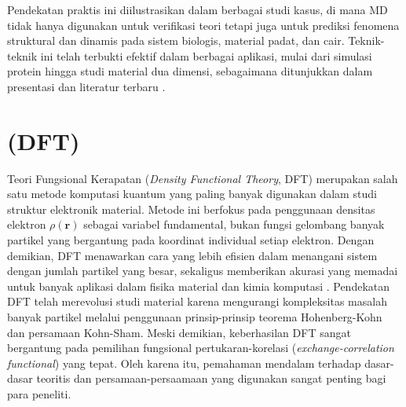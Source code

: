 Pendekatan praktis ini diilustrasikan dalam berbagai studi kasus, di mana MD tidak hanya digunakan untuk verifikasi teori tetapi juga untuk prediksi fenomena struktural dan dinamis pada sistem biologis, material padat, dan cair.
Teknik-teknik ini telah terbukti efektif dalam berbagai aplikasi, mulai dari simulasi protein hingga studi material dua dimensi, sebagaimana ditunjukkan dalam presentasi dan literatur terbaru \cite{Rapaport2004}.

\section{ (DFT)}
 Teori Fungsional Kerapatan (\emph{Density Functional Theory}, DFT) merupakan salah satu metode komputasi kuantum yang paling banyak digunakan dalam studi struktur elektronik material.
Metode ini berfokus pada penggunaan densitas elektron \(\rho(\mathbf{r})\) sebagai variabel fundamental, bukan fungsi gelombang banyak partikel yang bergantung pada koordinat individual setiap elektron.
Dengan demikian, DFT menawarkan cara yang lebih efisien dalam menangani sistem dengan jumlah partikel yang besar, sekaligus memberikan akurasi yang memadai untuk banyak aplikasi dalam fisika material dan kimia komputasi \cite{Kohn1965, Martin2004}.
Pendekatan DFT telah merevolusi studi material karena mengurangi kompleksitas masalah banyak partikel melalui penggunaan prinsip-prinsip teorema Hohenberg-Kohn dan persamaan Kohn-Sham.
Meski demikian, keberhasilan DFT sangat bergantung pada pemilihan fungsional pertukaran-korelasi (\emph{exchange-correlation functional}) yang tepat.
Oleh karena itu, pemahaman mendalam terhadap dasar-dasar teoritis dan persamaan-persaamaan yang digunakan sangat penting bagi para peneliti.

